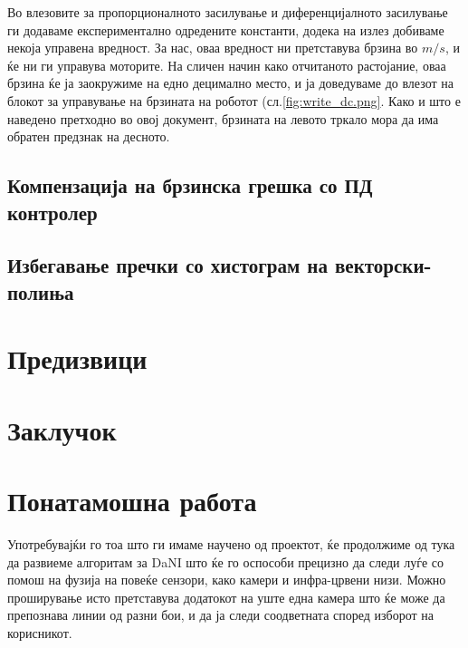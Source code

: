 \documentclass{article}
\begin{document}
Во влезовите за пропорционалното засилување и диференцијалното засилување ги додаваме експериментално одредените константи, додека на излез добиваме некоја управена вредност. За нас, оваа вредност ни претставува брзина во $m/s$, и ќе ни ги управува моторите. На сличен начин како отчитаното растојание, оваа брзина ќе ја заокружиме на едно децимално место, и ја доведуваме до влезот на блокот за управување на брзината на роботот (сл.\ref{fig:write_dc.png}. Како и што е наведено претходно во овој документ, брзината на левото тркало мора да има обратен предзнак на десното. 
\subsection{Компензација на брзинска грешка со ПД контролер}
\subsection{Избегавање пречки со хистограм на векторски-полиња}
\section{Предизвици}
\section{Заклучок}
\section{Понатамошна работа}
Употребувајќи го тоа што ги имаме научено од проектот, ќе продолжиме од тука да развиеме алгоритам за DaNI што ќе го оспособи прецизно да следи луѓе со помош на фузија на повеќе сензори, како камери и инфра-црвени низи. Можно проширување исто претставува додатокот на уште една камера што ќе може да препознава линии од разни бои, и да ја следи соодветната според изборот на корисникот.
\end{document}
